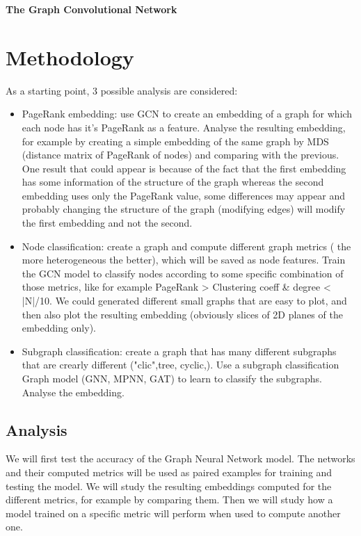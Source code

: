 \documentclass[a4paper]{article}
\begin{document}
\textbf{The Graph Convolutional Network}


\section{Methodology}

As a starting point, 3 possible analysis are considered:
\begin{itemize}
    \item PageRank embedding: use GCN to create an embedding of a graph for which each node has it's PageRank as a feature. Analyse the resulting embedding, for example by creating a simple embedding of the same graph by MDS (distance matrix of PageRank of nodes) and comparing with the previous. One result that could appear is because of the fact that the first embedding has some information of the structure of the graph whereas the second embedding uses only the PageRank value,  some differences may appear and probably changing the structure of the graph (modifying edges) will modify the first embedding and not the second.
    
    \item Node classification: create a graph and compute different graph metrics ( the more heterogeneous the better), which will be saved as node features. Train the GCN model to classify nodes according to some specific combination of those metrics, like for example PageRank > Clustering coeff & degree < |N|/10. We could generated different small graphs that are easy to plot, and then also plot the resulting embedding (obviously slices of 2D planes of the embedding only).
    
    \item Subgraph classification: create a graph that has many different subgraphs that are crearly different ("clic",tree, cyclic,). Use a subgraph classification Graph model (GNN, MPNN, GAT) to learn to classify the subgraphs. Analyse the embedding.
\end{itemize}

\subsection{Analysis}
We will first test the accuracy of the Graph Neural Network model. The networks and their computed metrics will be used as paired examples for training and testing the model.
We will study the resulting embeddings computed for the different metrics, for example by comparing them.
Then we will study how a model trained on a specific metric will perform when used to compute another one.
\end{document}
